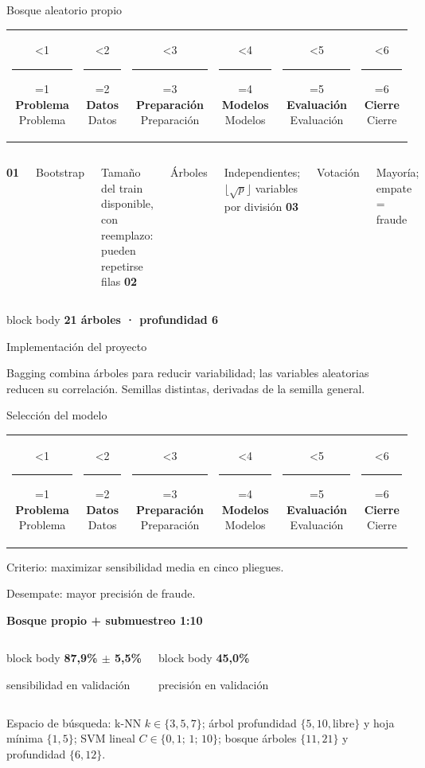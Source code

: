 \documentclass[aspectratio=169,10pt]{beamer}
\makeatletter
\newcommand{\metricbox}[2]{%
  \begin{beamercolorbox}[wd=\linewidth,sep=0.55em,center,rounded=true]{block body}%
    {\color{FraudBlue}\Large\bfseries #1}\par\vspace{0.12em}
    {\small #2}
  \end{beamercolorbox}%
}
\newcommand{\phasestep}[3]{%
  \begin{minipage}[t]{0.158\textwidth}\centering
    \ifnum#1<#2\color{FraudLine}\else\color{FraudBlue}\fi
    \rule{0.14\textwidth}{1.4pt}\par\vspace{0.04cm}
    \ifnum#1=#2
      {\color{FraudBlue}\bfseries\scriptsize #3}%
    \else
      {\color{FraudGray}\tiny #3}%
    \fi
  \end{minipage}%
}
\newcommand{\phasebar}[1]{%
  \vspace{0.03cm}
  \begin{center}
    \begin{tabular}{@{}c@{}c@{}c@{}c@{}c@{}c@{}}
      \phasestep{#1}{1}{Problema} &
      \phasestep{#1}{2}{Datos} &
      \phasestep{#1}{3}{Preparación} &
      \phasestep{#1}{4}{Modelos} &
      \phasestep{#1}{5}{Evaluación} &
      \phasestep{#1}{6}{Cierre}
    \end{tabular}
  \end{center}
  \vspace{0.12cm}
}
\makeatother
\begin{document}
\begin{frame}{Bosque aleatorio propio}
  \phasebar{4}
  \vfill
  \begin{columns}[c,onlytextwidth]
      {\color{FraudBlue}\Large\bfseries 01}\par\vspace{0.12cm}
      {\large Bootstrap}\par{\small\color{FraudGray}Tamaño del train disponible, con reemplazo: pueden repetirse filas}
    \centering{\Large\color{FraudLine}$\longrightarrow$}
      {\color{FraudBlue}\Large\bfseries 02}\par\vspace{0.12cm}
      {\large Árboles}\par{\small\color{FraudGray}Independientes; $\lfloor\sqrt{p}\rfloor$ variables por división}
    \centering{\Large\color{FraudLine}$\longrightarrow$}
      {\color{FraudBlue}\Large\bfseries 03}\par\vspace{0.12cm}
      {\large Votación}\par{\small\color{FraudGray}Mayoría; empate = fraude}
  \end{columns}
  \vspace{0.3cm}
  \metricbox{21 árboles · profundidad 6}{Implementación del proyecto}
  \vspace{0.18cm}
  {\small\color{FraudGray}Bagging combina árboles para reducir variabilidad; las variables aleatorias reducen su correlación. Semillas distintas, derivadas de la semilla general.}\par
  \vfill
\end{frame}

\begin{frame}{Selección del modelo}
  \phasebar{5}
  \vfill
  {\large Criterio: maximizar sensibilidad media en cinco pliegues.}\par
  {\normalsize\color{FraudGray}Desempate: mayor precisión de fraude.}\par
  \vspace{0.55cm}
  {\color{FraudBlue}\Large\bfseries Bosque propio + submuestreo 1:10}\par
  \vspace{0.32cm}
  \begin{columns}[c,onlytextwidth]
    \metricbox{87,9\% $\pm$ 5,5\%}{sensibilidad en validación}
    \metricbox{45,0\%}{precisión en validación}
  \end{columns}
  \vspace{0.34cm}
  {\small\color{FraudGray}Espacio de búsqueda: k-NN $k\in\{3,5,7\}$; árbol profundidad $\{5,10,\text{libre}\}$ y hoja mínima $\{1,5\}$; SVM lineal $C\in\{0{,}1;\,1;\,10\}$; bosque árboles $\{11,21\}$ y profundidad $\{6,12\}$.\par}
  \vfill
\end{frame}
\end{document}
